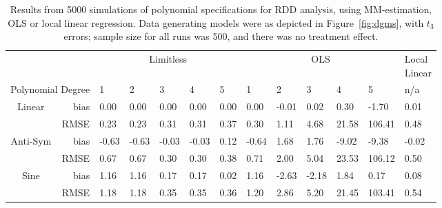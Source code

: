 
        \begin{table}[ht]
\centering
\begin{tabular}{cr|lllll|lllll|l } 
  \hline 
&& \multicolumn{5}{c|}{Limitless} &  \multicolumn{5}{c|}{OLS} &\makecell[c]{Local\\Linear}  \\
 \multicolumn{2}{r|}{Polynomial Degree}&1&2&3&4&5&1&2&3&4&5& n/a  \\
\hline
\hline
\multirow{ 2 }{*}{ Linear }& bias &0.00&0.00&0.00&0.00&0.00&0.00&-0.01&0.02&0.30&-1.70&0.01\\ 
& RMSE &0.23&0.23&0.31&0.31&0.37&0.30&1.11&4.68&21.58&106.41&0.48\\ 
\hline
\hline
\multirow{ 2 }{*}{ Anti-Sym }& bias &-0.63&-0.63&-0.03&-0.03&0.12&-0.64&1.68&1.76&-9.02&-9.38&-0.02\\ 
& RMSE &0.67&0.67&0.30&0.30&0.38&0.71&2.00&5.04&23.53&106.12&0.50\\ 
\hline
\hline
\multirow{ 2 }{*}{ Sine }& bias &1.16&1.16&0.17&0.17&0.02&1.16&-2.63&-2.18&1.84&0.17&0.08\\ 
& RMSE &1.18&1.18&0.35&0.35&0.36&1.20&2.86&5.20&21.45&103.41&0.54\\ 

 \hline
\end{tabular}
\caption{Results from 5000 simulations of polynomial specifications for RDD analysis, using MM-estimation, OLS or local linear regression. Data generating models were as depicted in Figure~\ref{fig:dgms}, with $t_{3}$ errors; sample size for all runs was 500, and there was no treatment effect.}
\label{tab:poly}
\end{table}
